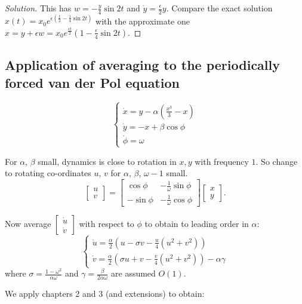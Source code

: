 \documentclass{notes}
\theoremstyle{plain}
\begin{document}
\begin{proof}[Solution]
This has $w = - \frac{y}{4} \sin 2 t$ and $\dot{y} = \frac{\epsilon}{2} y$.
Compare the exact solution $x(t) = x_0 e^{\epsilon(\frac{t}{2} -
\frac{1}{4} \sin 2 t)}$ with the approximate one
$x = y + \epsilon w = x_0 e^{\frac{\epsilon t}{2}} ( 1 - \frac{\epsilon}{4}
\sin 2 t)$.
\end{proof}

\subsection{Application of averaging to the periodically forced
van der Pol equation}

\[
\begin{cases}
\dot{x} = y - \alpha \left( \frac{x^3}{3} - x \right) \\
\dot{y} = -x + \beta \cos \phi \\
\dot{\phi} = \omega
\end{cases}
\]

For $\alpha$, $\beta$ small, dynamics is close to rotation in $x,y$
with frequency $1$.  So change to rotating co-ordinates $u$, $v$
for $\alpha$, $\beta$, $\omega - 1$ small.
\[
\begin{bmatrix}
u \\ v
\end{bmatrix}
= 
\begin{bmatrix}
\cos \phi & - \frac{1}{\omega} \sin \phi \\
-\sin \phi & - \frac{1}{\omega} \cos \phi
\end{bmatrix}
\begin{bmatrix}
x \\ y
\end{bmatrix}.
\]

Now average $\begin{bmatrix}
\dot{u} \\ \dot{v}
\end{bmatrix}$ with respect to $\phi$ to obtain to leading order in
$\alpha$:
\[
\begin{cases}
\dot{u} = \frac{\alpha}{2} \left(u - \sigma v - \frac{u}{4} (u^2 + v^2)
\right) \\
\dot{v} = \frac{\alpha}{2} \left(\sigma u + v - \frac{v}{4} (u^2 + v^2)
\right) - \alpha \gamma
\end{cases}
\]
where $\sigma = \frac{1-\omega^2}{\alpha \omega}$ and $\gamma = \frac{\beta}
{2 \alpha \omega}$ are assumed $O(1)$.

We apply chapters 2 and 3 (and extensions) to obtain:
\vspace*{5.5in}
\end{document}
